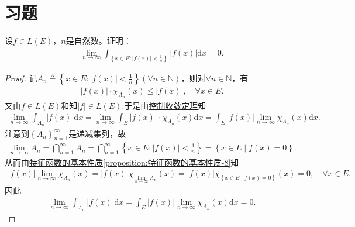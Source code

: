 \documentclass[../../main.tex]{subfiles}%
\begin{document}
\section{习题}

\begin{example}
设$f\in L(E)$，$n$是自然数。证明：
\begin{align*}
\lim\limits_{n\rightarrow \infty}\int_{\left\{ x\in E:\left| f\left( x \right) \right|<\frac{1}{n} \right\}}\left| f\left( x \right) \right|\mathrm{d}x=0.
\end{align*}
\end{example}
\begin{proof}

记$A_n\triangleq \left\{ x\in E:\left| f\left( x \right) \right|<\frac{1}{n} \right\}\left( \forall n\in \mathbb{N} \right)$，则对$\forall n\in \mathbb{N}$，有
\begin{align*}
\left| f\left( x \right) \right|\cdot \chi _{A_n}\left( x \right) \leqslant \left| f\left( x \right) \right|,\quad \forall x\in E.
\end{align*}
又由$f\in L\left( E \right)$和知$\left| f \right|\in L\left( E \right)$.于是由\hyperref[theorem:控制收敛定理]{控制收敛定理}知
\begin{align*}
\lim\limits_{n\rightarrow \infty}\int_{A_n}{\left| f\left( x \right) \right|\mathrm{d}x}=\lim\limits_{n\rightarrow \infty}\int_E{\left| f\left( x \right) \right|\cdot \chi _{A_n}\left( x \right) \mathrm{d}x}=\int_E{\left| f\left( x \right) \right|\lim\limits_{n\rightarrow \infty}\chi _{A_n}\left( x \right) \mathrm{d}x}.
\end{align*}
注意到$\left\{ A_n \right\} _{n=1}^{\infty}$是递减集列，故
\begin{align*}
\lim\limits_{n\rightarrow \infty}A_n=\bigcap\limits_{n=1}^{\infty}{A_n}=\bigcap\limits_{n=1}^{\infty}{\left\{ x\in E:\left| f\left( x \right) \right|<\frac{1}{n} \right\}}=\left\{ x\in E\mid f\left( x \right) =0 \right\}.
\end{align*}
从而由\hyperref[proposition:特征函数的基本性质-8]{特征函数的基本性质\ref{proposition:特征函数的基本性质-8}}知
\begin{align*}
\left| f\left( x \right) \right|\lim\limits_{n\rightarrow \infty}\chi _{A_n}\left( x \right) =\left| f\left( x \right) \right|\chi _{\lim\limits_{n\rightarrow \infty}A_n}\left( x \right) =\left| f\left( x \right) \right|\chi _{\left\{ x\in E\mid f\left( x \right) =0 \right\}}\left( x \right) =0,\quad \forall x\in E.
\end{align*}
因此
\begin{align*}
\lim\limits_{n\rightarrow \infty}\int_{A_n}{\left| f\left( x \right) \right|\mathrm{d}x}=\int_E{\left| f\left( x \right) \right|\lim\limits_{n\rightarrow \infty}\chi _{A_n}\left( x \right) \mathrm{d}x}=0.
\end{align*}
\end{proof}
\end{document}
